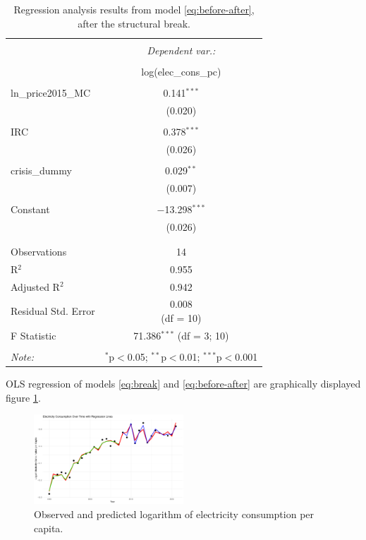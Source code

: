   \begin{table}[!htbp] \centering 
    \caption{Regression analysis results from model \eqref{eq:before-after}, after the structural break.} 
    \label{regression_after} 
  \begin{tabular}{@{\extracolsep{0pt}}lc} 
  \\[-1.8ex]\hline 
  \hline \\[-1.8ex] 
   & \multicolumn{1}{c}{\textit{Dependent var.:}} \\ 
  \cline{2-2} 
  \\[-1.8ex] & log(elec\_cons\_pc) \\ 
  \hline \\[-1.8ex] 
   ln\_price2015\_MC & 0.141$^{***}$ \\ 
    & (0.020) \\ 
    & \\ 
   IRC & 0.378$^{***}$ \\ 
    & (0.026) \\ 
    & \\ 
   crisis\_dummy & 0.029$^{**}$ \\ 
    & (0.007) \\ 
    & \\ 
   Constant & $-$13.298$^{***}$ \\ 
    & (0.026) \\ 
    & \\ 
  \hline \\[-1.8ex] 
  Observations & 14 \\ 
  R$^{2}$ & 0.955 \\ 
  Adjusted R$^{2}$ & 0.942 \\ 
  Residual Std. Error & \makecell{0.008 \\(df = 10)} \\ 
  F Statistic & \makecell{71.386$^{***}$ \\ (df = 3; 10)} \\ 
  \hline 
  \hline \\[-1.8ex] 
  \textit{Note:}  & \multicolumn{1}{r}{$^{*}$p$<$0.05; $^{**}$p$<$0.01; $^{***}$p$<$0.001} \\ 
  \end{tabular} 
  \end{table} 
  
  OLS regression of models \eqref{eq:break} and \eqref{eq:before-after} are graphically displayed figure \ref{fig:regstructural}. 

  \begin{figure}[h]
    \centering
      \includegraphics[width=0.5\textwidth]{Images/electricity_consumption_regression.jpeg}
      \caption{Observed and predicted logarithm of electricity consumption per capita.}
    \label{fig:regstructural}
  \end{figure}

